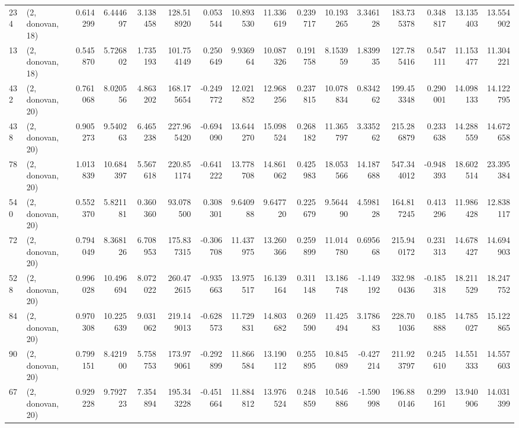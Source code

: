 \begin{tabular}{llrrrrrrrrrrrrrr}
234 &  (2, donovan, 18) &   0.614299 &   6.444697 &   3.138458 &   128.518920 &   0.053544 &  10.893530 &  11.336619 &  0.239717 &  10.193265 &   3.346128 &    183.735378 &   0.348817 &  13.135403 &   13.554902 \\
13  &  (2, donovan, 18) &   0.545870 &   5.726802 &   1.735193 &   101.754149 &   0.250649 &   9.936964 &  10.087326 &  0.191758 &   8.153959 &   1.839935 &    127.785416 &   0.547111 &  11.153477 &   11.304221 \\
432 &  (2, donovan, 20) &   0.761068 &   8.020556 &   4.863202 &   168.175654 &  -0.249772 &  12.021852 &  12.968256 &  0.237815 &  10.078834 &   0.834262 &    199.453348 &   0.290001 &  14.098133 &   14.122795 \\
438 &  (2, donovan, 20) &   0.905273 &   9.540263 &   6.465238 &   227.965420 &  -0.694090 &  13.644270 &  15.098524 &  0.268182 &  11.365797 &   3.335262 &    215.286879 &   0.233638 &  14.288559 &   14.672658 \\
78  &  (2, donovan, 20) &   1.013839 &  10.684397 &   5.567618 &   220.851174 &  -0.641222 &  13.778708 &  14.861062 &  0.425983 &  18.053566 &  14.187688 &    547.344012 &  -0.948393 &  18.602514 &   23.395384 \\
540 &  (2, donovan, 20) &   0.552370 &   5.821181 &   0.360360 &    93.078500 &   0.308301 &   9.640988 &   9.647720 &  0.225679 &   9.564490 &   4.598128 &    164.817245 &   0.413296 &  11.986428 &   12.838117 \\
72  &  (2, donovan, 20) &   0.794049 &   8.368126 &   6.708953 &   175.837315 &  -0.306708 &  11.437975 &  13.260366 &  0.259899 &  11.014780 &   0.695668 &    215.940172 &   0.231313 &  14.678427 &   14.694903 \\
528 &  (2, donovan, 20) &   0.996028 &  10.496694 &   8.072022 &   260.472615 &  -0.935663 &  13.975517 &  16.139164 &  0.311148 &  13.186748 &  -1.149192 &    332.980436 &  -0.185318 &  18.211529 &   18.247752 \\
84  &  (2, donovan, 20) &   0.970308 &  10.225639 &   9.031062 &   219.149013 &  -0.628573 &  11.729831 &  14.803682 &  0.269590 &  11.425494 &   3.178683 &    228.701036 &   0.185888 &  14.785027 &   15.122865 \\
90  &  (2, donovan, 20) &   0.799151 &   8.421900 &   5.758753 &   173.979061 &  -0.292899 &  11.866584 &  13.190112 &  0.255895 &  10.845089 &  -0.427214 &    211.923797 &   0.245610 &  14.551333 &   14.557603 \\
67  &  (2, donovan, 20) &   0.929228 &   9.792723 &   7.354894 &   195.343228 &  -0.451664 &  11.884812 &  13.976524 &  0.248859 &  10.546886 &  -1.590998 &    196.880146 &   0.299161 &  13.940906 &   14.031399 \\

\end{tabular}
